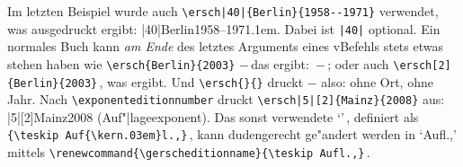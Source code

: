 \documentclass[12pt,a4paper]{article}
\begin{document}
Im letzten Beispiel wurde auch \verb!\ersch|40|{Berlin}{1958--1971}! \label{ersch}
verwendet, was ausgedruckt ergibt:\hspace{.1em} {\small \ersch|40|{Berlin}{1958--1971}}\kern.1em.
Dabei ist \verb!|40|! optional. Ein normales Buch kann \textit{am Ende} des
letztes Arguments eines v\fhy Befehls stets etwas stehen haben wie
\hspace{.1em}\verb!\ersch{Berlin}{2003}!\hspace{.1em} $-$\,das ergibt:\hspace{.1em} {\small {}}\,$-$\,; 
oder auch\hspace{.1em} \verb!\ersch[2]{Berlin}{2003}!\,, was\hspace{.1em} {\small {}}\hspace{.1em}
ergibt. Und\hspace{.1em} \verb!\ersch{}{}!\hspace{.1em} druckt\hspace{.1em} 
{\small \ersch{}{}}\hspace{.1em} $-$ also: ohne Ort, ohne
Jahr. Nach\hspace{.1em} \verb|\exponenteditionnumber|\hspace{.1em} druckt
\verb!\ersch|5|[2]{Mainz}{2008}! aus:\hspace{.1em} {\small \exponenteditionnumber
\ersch|5|[2]{Mainz}{2008}}\hspace{.1em} (Auf"|lageexponent). Das sonst verwendete 
{\small `\gerscheditionname'}\,, definiert als\hspace{.2em} 
\verb|{\teskip Auf{\kern.03em}l.,}|\,, kann dudengerecht  ge"andert werden in
{\small \renewcommand{\gerscheditionname}{\teskip Aufl.,} `\gerscheditionname'}\hspace{.2em} 
mittels\hspace{.2em} \verb+\renewcommand{\gerscheditionname}{\teskip Aufl.,}+\,. 
\end{document}
